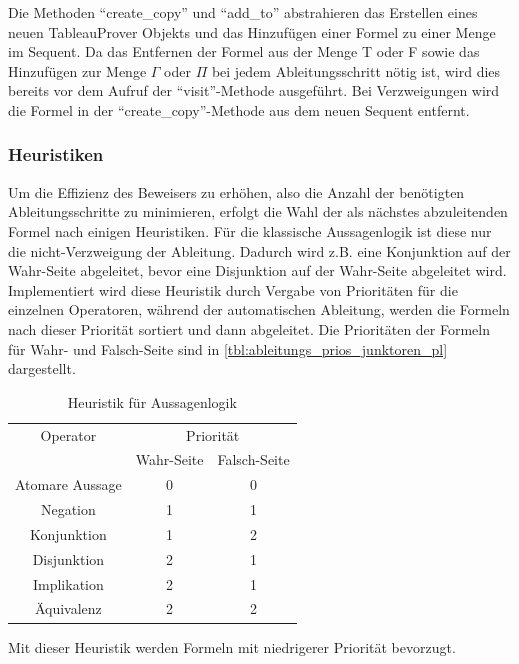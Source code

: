 Die Methoden ``create\_copy'' und ``add\_to'' abstrahieren das Erstellen eines neuen TableauProver Objekts und das Hinzufügen einer Formel zu einer Menge im Sequent. Da das Entfernen der Formel aus der Menge T oder F sowie das Hinzufügen zur Menge $\Gamma$ oder $\Pi$ bei jedem Ableitungsschritt nötig ist, wird dies bereits vor dem Aufruf der ``visit''-Methode ausgeführt. Bei Verzweigungen wird die Formel in der ``create\_copy''-Methode aus dem neuen Sequent entfernt.

\subsubsection{\label{sec:heuristiken}Heuristiken}
Um die Effizienz des Beweisers zu erhöhen, also die Anzahl der benötigten Ableitungsschritte zu minimieren, erfolgt die Wahl der als nächstes abzuleitenden Formel nach einigen Heuristiken. Für die klassische Aussagenlogik ist diese nur die nicht-Verzweigung der Ableitung. Dadurch wird z.B. eine Konjunktion auf der Wahr-Seite abgeleitet, bevor eine Disjunktion auf der Wahr-Seite abgeleitet wird. Implementiert wird diese Heuristik durch Vergabe von Prioritäten für die einzelnen Operatoren, während der automatischen Ableitung, werden die Formeln nach dieser Priorität sortiert und dann abgeleitet. Die Prioritäten der Formeln für Wahr- und Falsch-Seite sind in \autoref{tbl:ableitungs_prios_junktoren_pl} dargestellt.

\begin{table}[h]
\begin{center}
\begin{tabular}{|c|c|c|}
\hline
Operator & \multicolumn{2}{c|}{Priorität} \\
\cline{2-3}
 & Wahr-Seite & Falsch-Seite \\
\hline
Atomare Aussage & 0 & 0 \\
Negation & 1 & 1 \\
Konjunktion & 1 & 2 \\
Disjunktion & 2 & 1 \\
Implikation & 2 & 1 \\
Äquivalenz & 2 & 2 \\
\hline
\end{tabular}
\end{center}
\caption{\label{tbl:ableitungs_prios_junktoren_pl}Heuristik für Aussagenlogik}
\end{table}

Mit dieser Heuristik werden Formeln mit niedrigerer Priorität bevorzugt.

